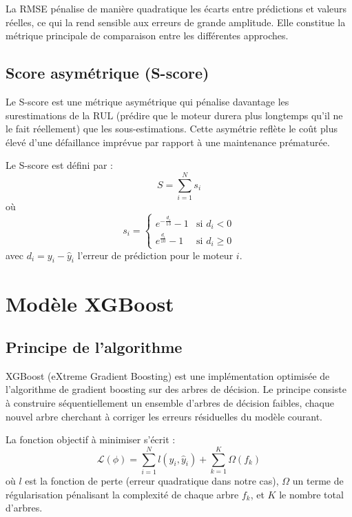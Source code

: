 \documentclass[12pt,a4paper]{report}
\theoremstyle{definition}
\begin{document}
La RMSE pénalise de manière quadratique les écarts entre prédictions et valeurs réelles, ce qui la rend sensible aux erreurs de grande amplitude. Elle constitue la métrique principale de comparaison entre les différentes approches.

\subsection{Score asymétrique (S-score)}

Le S-score est une métrique asymétrique qui pénalise davantage les surestimations de la RUL (prédire que le moteur durera plus longtemps qu'il ne le fait réellement) que les sous-estimations. Cette asymétrie reflète le coût plus élevé d'une défaillance imprévue par rapport à une maintenance prématurée.

Le S-score est défini par :
\begin{equation}
    S = \sum_{i=1}^{N} s_i
\end{equation}
où
\begin{equation}
    s_i = 
    \begin{cases}
        e^{-\frac{d_i}{13}} - 1 & \text{si } d_i < 0 \\
        e^{\frac{d_i}{10}} - 1 & \text{si } d_i \geq 0
    \end{cases}
\end{equation}
avec $d_i = y_i - \hat{y}_i$ l'erreur de prédiction pour le moteur $i$.

\section{Modèle XGBoost}

\subsection{Principe de l'algorithme}

XGBoost (eXtreme Gradient Boosting) est une implémentation optimisée de l'algorithme de gradient boosting sur des arbres de décision. Le principe consiste à construire séquentiellement un ensemble d'arbres de décision faibles, chaque nouvel arbre cherchant à corriger les erreurs résiduelles du modèle courant.

La fonction objectif à minimiser s'écrit :
\begin{equation}
    \mathcal{L}(\phi) = \sum_{i=1}^{N} l(y_i, \hat{y}_i) + \sum_{k=1}^{K} \Omega(f_k)
\end{equation}
où $l$ est la fonction de perte (erreur quadratique dans notre cas), $\Omega$ un terme de régularisation pénalisant la complexité de chaque arbre $f_k$, et $K$ le nombre total d'arbres.
\end{document}
